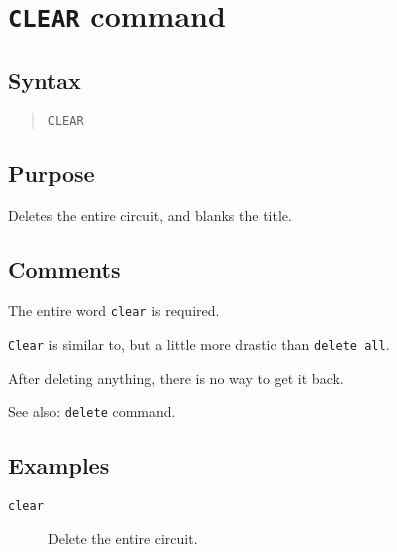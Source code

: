 %
%
%
%
\section{{\tt CLEAR} command}
\subsection{Syntax}
\begin{verse}
{\tt CLEAR}
\end{verse}
\subsection{Purpose}

Deletes the entire circuit, and blanks the title.
\subsection{Comments}

The entire word {\tt clear} is required.

{\tt Clear} is similar to, but a little more drastic than {\tt delete all}.

After deleting anything, there is no way to get it back.

See also: {\tt delete} command.
\subsection{Examples}

\begin{description}

\item[{\tt clear}] Delete the entire circuit.

\end{description}
